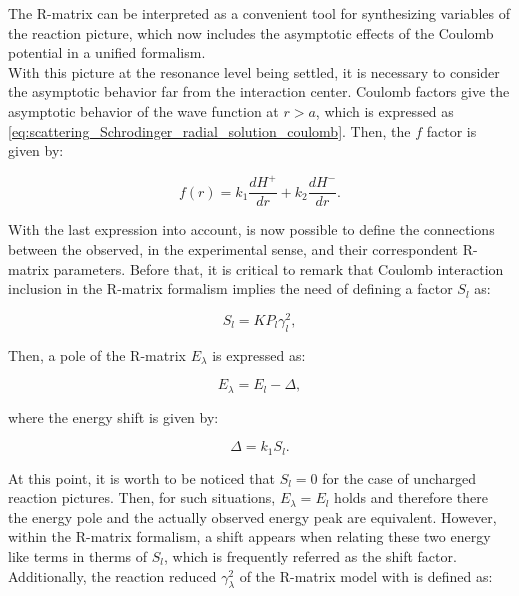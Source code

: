 \documentclass[openany]{book}
\begin{document}
The R-matrix can be interpreted as a convenient tool for synthesizing variables of the reaction picture, which now includes the asymptotic effects of the Coulomb potential in a unified formalism. \\

With this picture at the resonance level being settled, it is necessary to consider the asymptotic behavior far from the interaction center. Coulomb factors give the asymptotic behavior of the wave function at $r > a$, which is expressed as \ref{eq:scattering_Schrodinger_radial_solution_coulomb}. Then, the $f$ factor is given by: 

\begin{equation}   \label{eq:rmatrix_f_Coulomb}
	f(r) = k_1\frac{dH^{+}}{dr}  + k_2 \frac{dH^{-}}{dr}.
\end{equation}

With the last expression into account, is now possible to define the connections between the observed, in the experimental sense, and their correspondent R-matrix parameters. Before that, it is critical to remark that Coulomb interaction inclusion in the R-matrix formalism implies the need of defining a factor $S_l$ as:

\begin{equation}   \label{eq:rmatrix_shiftFactor}
	S_l= K P_l\gamma^2_l,
\end{equation}

Then, a pole of the R-matrix $E_\lambda$ is expressed as: 

\begin{equation}  \label{eq:rmatrix_energyPole}
	E_\lambda =  E_l - \Delta, 
\end{equation}

where the energy shift is given by: 

\begin{equation}  \label{eq:rmatrix_energyShift}
	\Delta = k_1 S_l.
\end{equation}

At this point, it is worth to be noticed that $S_l = 0$ for the case of uncharged reaction pictures. Then, for such situations, $E_\lambda = E_l$ holds and therefore there the energy pole and the actually observed energy peak are equivalent. However, within the R-matrix formalism, a shift appears when relating these two energy like terms in therms of $S_l$, which is frequently referred as the shift factor. \\

Additionally, the reaction reduced $\gamma^2_\lambda$ of the R-matrix model  with is defined as:
\end{document}
